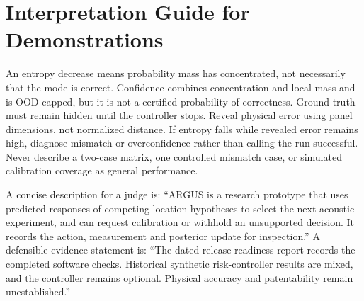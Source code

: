 \documentclass[conference]{IEEEtran}
\begin{document}
\section{Interpretation Guide for Demonstrations}
An entropy decrease means probability mass has concentrated, not necessarily that the mode is correct. Confidence combines concentration and local mass and is OOD-capped, but it is not a certified probability of correctness. Ground truth must remain hidden until the controller stops. Reveal physical error using panel dimensions, not normalized distance. If entropy falls while revealed error remains high, diagnose mismatch or overconfidence rather than calling the run successful. Never describe a two-case matrix, one controlled mismatch case, or simulated calibration coverage as general performance.

A concise description for a judge is: ``ARGUS is a research prototype that uses predicted responses of competing location hypotheses to select the next acoustic experiment, and can request calibration or withhold an unsupported decision. It records the action, measurement and posterior update for inspection.'' A defensible evidence statement is: ``The dated release-readiness report records the completed software checks. Historical synthetic risk-controller results are mixed, and the controller remains optional. Physical accuracy and patentability remain unestablished.''



\end{document}

